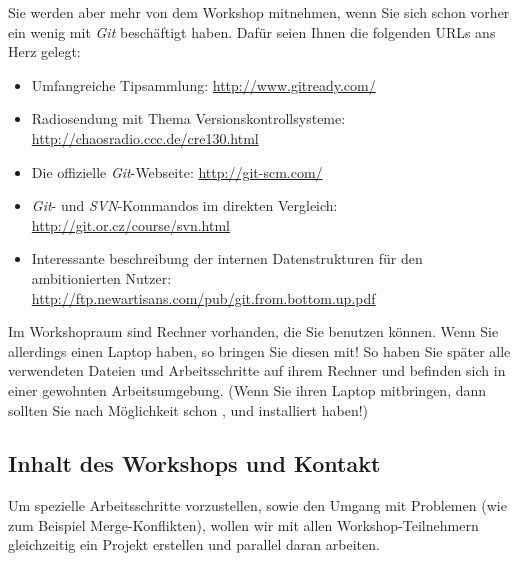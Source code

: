 \documentclass[11pt,            %
               a4paper,         %
               oneside,         %
               DIV12,           %
               fleqn,           %
               smallheadings,   %
               halfparskip,     %
               nochapterprefix, %
               bibtotocnumbered,%
              ]{scrartcl} %
\begin{document}
Sie werden aber mehr von dem Workshop mitnehmen, wenn Sie sich schon
vorher ein wenig mit \emph{Git} beschäftigt haben. Dafür seien Ihnen
die folgenden URLs ans Herz gelegt:

\begin{itemize}
\item Umfangreiche Tipsammlung:
  \url{http://www.gitready.com/}
\item Radiosendung mit Thema Versionskontrollsysteme:\\
  \url{http://chaosradio.ccc.de/cre130.html}
\item Die offizielle \emph{Git}-Webseite:
  \url{http://git-scm.com/}
\item \emph{Git}- und \emph{SVN}-Kommandos im direkten Vergleich:\\
  \url{http://git.or.cz/course/svn.html}
\item Interessante beschreibung der internen Datenstrukturen für den ambitionierten Nutzer:\\
    \url{http://ftp.newartisans.com/pub/git.from.bottom.up.pdf}
\end{itemize}

Im Workshopraum sind Rechner vorhanden, die Sie benutzen können. Wenn
Sie allerdings einen Laptop haben, so bringen Sie diesen mit! So haben
Sie später alle verwendeten Dateien und Arbeitsschritte auf ihrem
Rechner und befinden sich in einer gewohnten Arbeitsumgebung.
(Wenn Sie ihren Laptop mitbringen, dann sollten Sie nach Möglichkeit
schon ,  und  installiert haben!)




\subsection*{Inhalt des Workshops und Kontakt}

Um spezielle Arbeitsschritte vorzustellen, sowie den Umgang mit
Problemen (wie zum Beispiel Merge-Konflikten), wollen wir mit allen
Workshop-Teilnehmern gleichzeitig ein Projekt erstellen und parallel
daran arbeiten.
\end{document}
